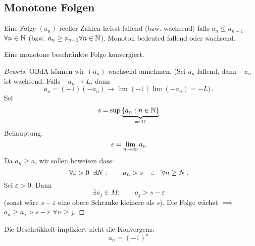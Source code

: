 \subsection{Monotone Folgen}
\begin{Def}
  Eine Folge $(a_n)$ reeller Zahlen heisst fallend (bzw. wachsend) 
falls $a_n\leq a_{n-1}$ $\forall n\in\mathbb{N}$ (bzw. $a_n\geq a_{n-1}\forall n\in\mathbb{N}$). 
Monoton bedeuted fallend oder wachsend.
\end{Def}
\begin{Sat}
  Eine monotone beschränkte Folge konvergiert.
\end{Sat}
\begin{proof}[Beweis]
  OBdA k\"onnen wir $(a_n)$ wachsend annehmen. (Sei $a_n$ fallend, 
dann $-a_n$ ist wachsend. Falls $-a_n \to L$, dann 
\[
a_n=(-1)(-a_n) \to \lim(-1)\lim(-a_n) = -L)\, .
\] 
Sei 
  \[s=\sup \underbrace{\left\{ a_n:n\in\mathbb{N} \right\}}_{=:M}\]
  Behauptung:
  \[s=\displaystyle\lim_{n\rightarrow\infty} a_n\]
Da $a_n\geq a$, wir sollen beweisen dass:
\begin{equation}\label{e:zuBeweisen}
 \forall \varepsilon>0\hspace{2mm}\exists N: \qquad
a_n> s-\varepsilon\quad\forall n\geq N\, .
\end{equation}
Sei $\varepsilon > 0$. Dann
  \[\exists a_j\in M:\qquad a_j>s-\varepsilon\]
(sonst w\"are $s-\varepsilon$ eine obere Schranke kleinere als
$s$).
  Die Folge wächst $\implies$ $a_n\geq a_j>s-\varepsilon$ $\forall n\geq j$.
\end{proof}
\begin{Bsp} Die Beschr\"akheit impliziert nicht die Konvergenz:
 \[a_n=(-1)^n\]
\end{Bsp}

